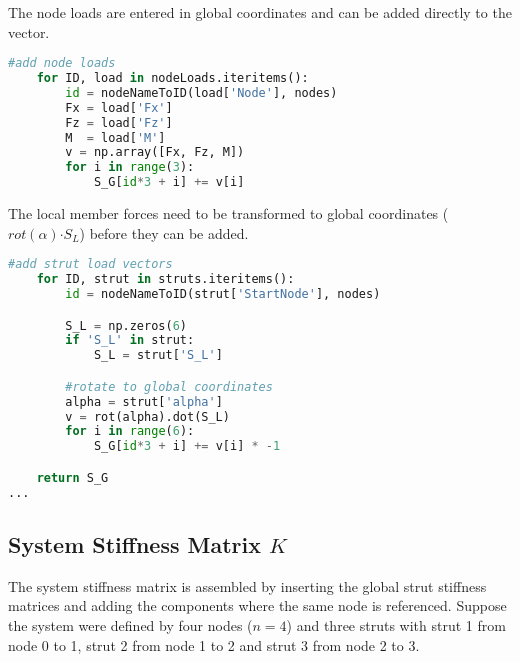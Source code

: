 The node loads are entered in global coordinates and can be added directly to the vector.

\begin{inconsolata}
\begin{minipage}{\linewidth}
\begin{lstlisting}[language=python]
    #add node loads
    for ID, load in nodeLoads.iteritems():
        id = nodeNameToID(load['Node'], nodes)
        Fx = load['Fx']
        Fz = load['Fz']
        M  = load['M']
        v = np.array([Fx, Fz, M])
        for i in range(3):
            S_G[id*3 + i] += v[i]
\end{lstlisting}
\end{minipage}
\end{inconsolata}

The local member forces need to be transformed to global coordinates ($rot(\alpha) \boldsymbol{\cdot} S_L$) before they can be added.

\begin{inconsolata}
\begin{minipage}{\linewidth}
\begin{lstlisting}[language=python]
    #add strut load vectors
    for ID, strut in struts.iteritems():
        id = nodeNameToID(strut['StartNode'], nodes)

        S_L = np.zeros(6)
        if 'S_L' in strut:
            S_L = strut['S_L']

        #rotate to global coordinates
        alpha = strut['alpha']
        v = rot(alpha).dot(S_L)
        for i in range(6):
            S_G[id*3 + i] += v[i] * -1

    return S_G
...
\end{lstlisting}
\end{minipage}
\end{inconsolata}

\pagebreak

\subsection{System Stiffness Matrix $K$}
\label{sec:asmK}

The system stiffness matrix is assembled by inserting the global strut stiffness matrices and adding the components where the same node is referenced.
Suppose the system were defined by four nodes ($n=4$) and three struts with strut 1 from node 0 to 1, strut 2 from node 1 to 2 and strut 3 from node 2 to 3.

